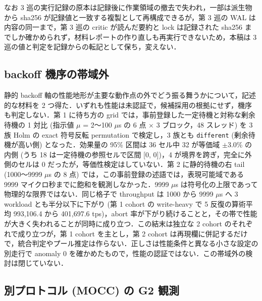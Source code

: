 \documentclass[submit,techrep,noauthor]{ipsj}
\begin{document}
なお 3 巡の実行記録の原本は記録後に作業領域の撤去で失われ，一部は派生物から sha256 が記録値と一致する複製として再構成できるが，第 3 巡の WAL は内容の同一まで，第 3 巡の critic が読んだ要約と lock は記録された sha256 までしか確かめられず，材料レポートの作り直しも再実行できないため，本稿は 3 巡の値と判定を記録からの転記として保ち，変えない．

\subsection{backoff 機序の帯域外}
\label{sec:eval-b10}

静的 backoff 軸の性能地形が主要な動作点の外でどう振る舞うかについて，記述的な材料を 2 つ得た．いずれも性能は未認証で，候補採用の根拠にせず，機序も判定しない．第 1 に待ち方の grid では，事前登録した一定待機と対称な剰余待機の 1 対比 (指示値 $\mu$ = 2〜100 $\mu$s の 6 点 $\times$ 3 ブロック，48 スレッド) を 3 族 Holm の exact 符号反転 permutation で検定し，3 族とも \texttt{different} (剰余待機が高い側) となった．効果量の 95\% 区間は 36 セル中 32 が等価域 $\pm$3.0\% の内側 (うち 18 は一定待機の参照セルで区間 [0, 0])，4 が境界を跨ぎ，完全に外側のセルは 0 だったが，等価性検定はしていない．第 2 に静的待機の右 tail (1000〜9999 $\mu$s の 8 点) では，この事前登録の述語では，表現可能域である 9999 マイクロ秒までに飽和を観測しなかった．9999 $\mu$s は符号化の上限であって物理的な限界ではない．同じ格子で throughput は 1000 から 9999 $\mu$s へ 3 workload とも半分以下に下がり (第 1 cohort の write-heavy で 5 反復の算術平均 993,106.4 から 401,697.6 tps)，abort 率が下がり続けることと，その帯で性能が大きく失われることが同時に成り立つ．この結末は独立な 2 cohort のそれぞれで成り立つが，第 1 cohort を主とし，第 2 cohort は再現欄に併記するだけで，統合判定やプール推定は作らない．正しさは性能条件と異なる小さな設定の別走行で anomaly 0 を確かめたもので，性能の認証ではない．この帯域外の検討は閉じていない．

\subsection{別プロトコル (MOCC) の G2 観測}
\label{sec:eval-mocc}
\end{document}
